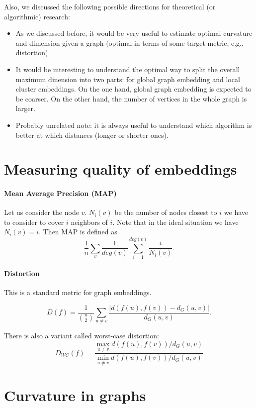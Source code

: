 \documentclass{article}
\begin{document}
Also, we discussed the following possible directions for theoretical (or algorithmic) research:
\begin{itemize}
    \item As we discussed before, it would be very useful to estimate optimal curvature and dimension given a graph (optimal in terms of some target metric, e.g., distortion).
    \item It would be interesting to understand the optimal way to split the overall maximum dinension into two parts: for global graph embedding and local cluster embeddings. On the one hand, global graph embedding is expected to be coarser. On the other hand, the number of vertices in the whole graph is larger. 
    \item Probably unrelated note: it is always useful to understand which algorithm is better at which distances (longer or shorter ones).
\end{itemize}

\section{Measuring quality of embeddings}



\paragraph{Mean Average Precision (MAP)}

Let us consider the node $v$. $N_i(v)$ be the number of nodes closest to $i$ we have to consider to cover $i$ neighbors of $i$. Note that in the ideal situation we have $N_i(v) = i$. Then MAP is defined as 
\[
\frac{1}{n} \sum_v \frac{1}{deg(v)} \sum_{i=1}^{deg(v)} \frac{i}{N_i(v)}. 
\]

\paragraph{Distortion} This is a standard metric for graph embeddings.

\[
D(f) = \frac{1}{\binom{n}{2}} \sum_{u \neq v}  \frac{|d(f(u),f(v)) - d_G(u,v)|}{d_G(u,v)}.
\]

There is also a variant called worst-case distortion:
\[
D_{WC}(f) = \frac{\max_{u\neq v}d(f(u),f(v))/d_G(u,v)}{\min_{u\neq v}d(f(u),f(v))/d_G(u,v)} 
\]

\section{Curvature in graphs}
\end{document}
